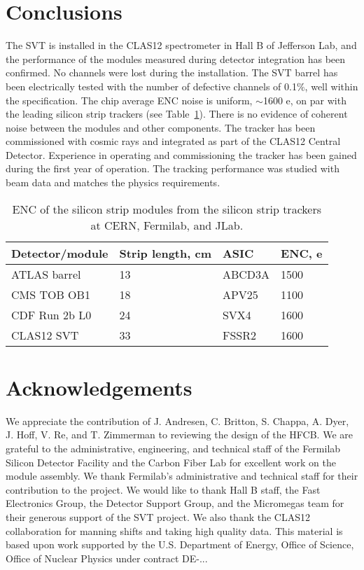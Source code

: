 \section{Conclusions}

The SVT is installed in the CLAS12 spectrometer in Hall B of Jefferson Lab, and the performance of the modules measured during detector integration has been confirmed. No channels were lost during the installation. The SVT barrel has been electrically  tested with the number of defective channels of 0.1$\%$, well within the specification. The chip average ENC noise is uniform, $\sim$1600 e, on par with the leading silicon strip trackers (see Table~\ref{tab:enc-table}). There is no evidence of coherent noise between the modules and other components. The tracker has been commissioned with cosmic rays and integrated as part of the CLAS12 Central Detector. Experience in operating and commissioning the tracker has been gained during the first year of operation. The tracking performance was studied with beam data and matches the physics requirements. 

\begin{table}[hbt]
\begin{tabular}{llll}
\hline
Detector/module      & Strip length, cm & ASIC         & ENC, e\\ \hline
ATLAS barrel           & 13                      & ABCD3A    & 1500  \\
CMS TOB OB1        & 18                      & APV25       & 1100  \\
CDF Run 2b L0        & 24                     & SVX4         & 1600  \\
CLAS12 SVT            & 33                     & FSSR2       & 1600 \\ \hline
\end{tabular}
\caption{ENC of the silicon strip modules from the silicon strip trackers at CERN, Fermilab, and JLab.}
\label{tab:enc-table}
\end{table}

\section{Acknowledgements}

We appreciate the contribution of J.  Andresen, C. Britton, S. Chappa, A. Dyer, J. Hoff, V. Re, and T. Zimmerman to reviewing the design of the HFCB. We are grateful to the administrative, engineering, and technical staff of the Fermilab Silicon Detector Facility and the Carbon Fiber Lab for excellent work on the module assembly. We thank Fermilab's administrative and technical staff for their contribution to the project. We would like to thank Hall B staff, the Fast Electronics Group, the Detector Support Group, and the Micromegas team for their generous support of the SVT project. We  also  thank the CLAS12 collaboration for manning shifts and taking high quality data. This material is based upon work supported by the U.S. Department of Energy, Office of Science, Office of Nuclear Physics under contract DE-...


